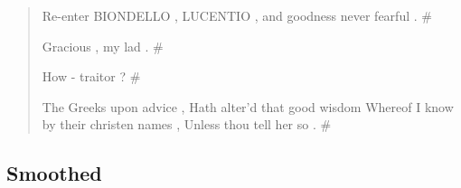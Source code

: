 \documentclass{article}
\begin{document}
			\begin{quote}

			Re-enter BIONDELLO , LUCENTIO , and goodness never fearful . \#

			Gracious , my lad . \#

			How - traitor ? \#

			The Greeks upon advice , Hath alter'd that good wisdom Whereof I know
			by their christen names , Unless thou tell her so . \#

			\end{quote}

	\subsection*{Smoothed}
\end{document}
